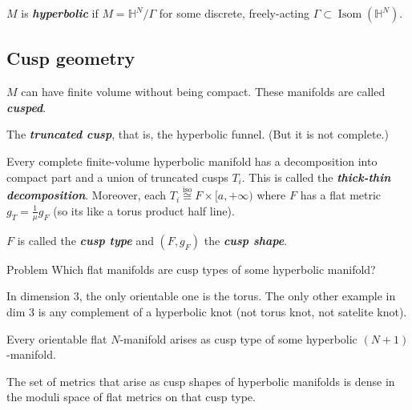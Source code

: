 $M$ is \textit{\textbf{hyperbolic}} if  $M=\mathbb{H}^N/\Gamma$ for some discrete, freely-acting $\Gamma \subset \operatorname{Isom}(\mathbb{H}^N)$.

\subsection{Cusp geometry}

\begin{remark}\leavevmode
	$M$ can have finite volume without being compact. These manifolds are called \textit{\textbf{cusped}}.
\end{remark}

\begin{example}\leavevmode
	The \textit{\textbf{truncated cusp}}, that is, the hyperbolic funnel. (But it is not complete.)
\end{example}

\begin{prop}\leavevmode
	Every complete finite-volume hyperbolic manifold has a decomposition into compact part and a union of truncated cusps $T_i$. This is called the \textit{\textbf{thick-thin decomposition}}. Moreover, each $T_i\overset{\operatorname{is o}}{\cong}F \times [a, +\infty)$ where $F$ has a flat metric $g_T=\frac{1}{\mu}g_F$ (so its like a torus product half line).

	$F$ is called the \textit{\textbf{cusp type}} and $(F,g_F)$ the  \textit{\textbf{cusp shape}}.
\end{prop}


\begin{thing4}{Problem}\leavevmode
	Which flat manifolds are cusp types of some hyperbolic manifold?
\end{thing4}

In dimension 3, the only orientable one is the torus. The only other example in dim 3 is any complement of a hyperbolic knot (not torus knot, not satelite knot).

\begin{thm}[M C Reynolds, '09]\leavevmode
Every orientable flat $N$-manifold arises as cusp type of some hyperbolic $(N+1)$-manifold.
\end{thm}

\begin{thm}[Nimershwin, 90's]\leavevmode
The set of metrics that arise as cusp shapes of hyperbolic manifolds is dense in the moduli space of flat metrics on that cusp type.
\end{thm}

